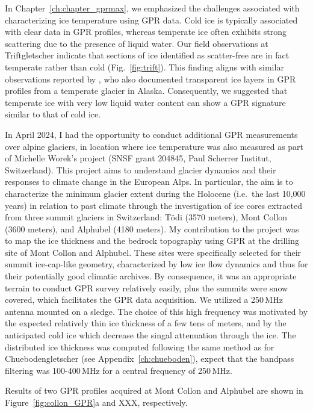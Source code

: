 In Chapter~\ref{ch:chapter_gprmax}, we emphasized the challenges associated with characterizing ice temperature using GPR data. Cold ice is typically associated with clear data in GPR profiles, whereas temperate ice often exhibits strong scattering due to the presence of liquid water. Our field observations at Triftgletscher indicate that sections of ice identified as scatter-free are in fact temperate rather than cold (Fig.~\ref{fig:trift}). This finding aligns with similar observations reported by \cite{Brown&al2009}, who also documented transparent ice layers in GPR profiles from a temperate glacier in Alaska. Consequently, we suggested that temperate ice with very low liquid water content can show a GPR signature similar to that of cold ice. 

In April 2024, I had the opportunity to conduct additional GPR measurements over alpine glaciers, in location where ice temperature was also measured as part of Michelle Worek's project (SNSF grant 204845, Paul Scherrer Institut, Switzerland). This project aims to understand glacier dynamics and their responses to climate change in the European Alps. In particular, the aim is to characterize the minimum glacier extent during the Holocene (i.e.\ the last 10,000 years) in relation to past climate through the investigation of ice cores extracted from three summit glaciers in Switzerland: Tödi (3570 meters), Mont Collon (3600 meters), and Alphubel (4180 meters). My contribution to the project was to map the ice thickness and the bedrock topography using GPR at the drilling site of Mont Collon and Alphubel. These sites were specifically selected for their summit ice-cap-like geometry, characterized by low ice flow dynamics and thus for their potentially good climatic archives. By consequence, it was an appropriate terrain to conduct GPR survey relatively easily, plus the summits were snow covered, which facilitates the GPR data acquisition. We utilized a 250\,MHz antenna mounted on a sledge. The choice of this high frequency was motivated by the expected relatively thin ice thickness of a few tens of meters, and by the anticipated cold ice which decrease the singal attenuation through the ice. The distributed ice thickness was computed following the same method as for Chuebodengletscher (see Appendix~\ref{ch:chueboden}), expect that the bandpass filtering was 100-400\,MHz for a central frequency of 250\,MHz.

Results of two GPR profiles acquired at Mont Collon and Alphubel are shown in Figure~\ref{fig:collon_GPR}a and XXX, respectively.

